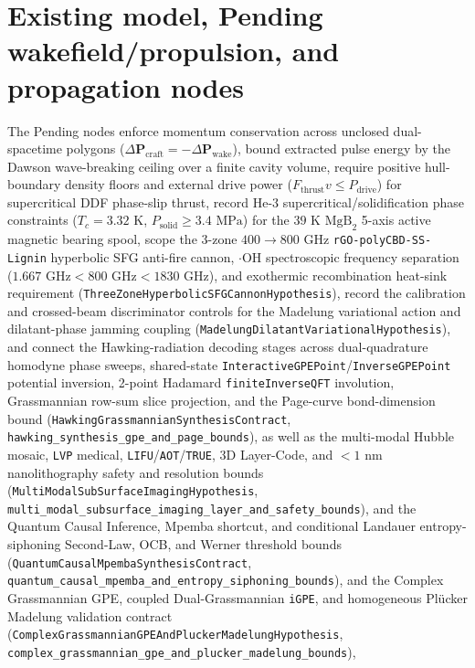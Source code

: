 \section{Existing model, Pending wakefield/propulsion, and propagation nodes}

The Pending nodes enforce momentum conservation across unclosed dual-spacetime
polygons ($\Delta\mathbf P_{\mathrm{craft}}=-\Delta\mathbf P_{\mathrm{wake}}$),
bound extracted pulse energy by the Dawson wave-breaking ceiling over a finite
cavity volume, require positive hull-boundary density floors and external drive
power ($F_{\mathrm{thrust}} v\le P_{\mathrm{drive}}$) for supercritical DDF
phase-slip thrust, record $\mathrm{He\text{-}3}$ supercritical/solidification
phase constraints ($T_c=3.32\text{ K}$, $P_{\mathrm{solid}}\ge 3.4\text{ MPa}$)
for the $39\text{ K}$ $\mathrm{MgB}_2$ 5-axis active magnetic bearing spool,
scope the 3-zone $400\to 800\text{ GHz}$ \texttt{rGO-polyCBD-SS-Lignin}
hyperbolic SFG anti-fire cannon, $\cdot\mathrm{OH}$ spectroscopic frequency
separation ($1.667\text{ GHz}<800\text{ GHz}<1830\text{ GHz}$), and exothermic
recombination heat-sink requirement (\texttt{ThreeZoneHyperbolicSFGCannonHypothesis}),
record the calibration and crossed-beam discriminator controls for the
Madelung variational action and dilatant-phase jamming coupling
(\texttt{MadelungDilatantVariationalHypothesis}), and connect the Hawking-radiation
decoding stages across dual-quadrature homodyne phase sweeps, shared-state
\texttt{InteractiveGPEPoint}/\texttt{InverseGPEPoint} potential inversion,
2-point Hadamard \texttt{finiteInverseQFT} involution, Grassmannian row-sum
slice projection, and the Page-curve bond-dimension bound
(\texttt{HawkingGrassmannianSynthesisContract}, \texttt{hawking\_synthesis\_gpe\_and\_page\_bounds}),
as well as the multi-modal Hubble mosaic, \texttt{LVP} medical, \texttt{LIFU}/\texttt{AOT}/\texttt{TRUE},
3D Layer-Code, and $<1\text{ nm}$ nanolithography safety and resolution bounds
(\texttt{MultiModalSubSurfaceImagingHypothesis}, \texttt{multi\_modal\_subsurface\_imaging\_layer\_and\_safety\_bounds}),
and the Quantum Causal Inference, Mpemba shortcut, and conditional Landauer
entropy-siphoning Second-Law, OCB, and Werner threshold bounds
(\texttt{QuantumCausalMpembaSynthesisContract}, \texttt{quantum\_causal\_mpemba\_and\_entropy\_siphoning\_bounds}),
and the Complex Grassmannian GPE, coupled Dual-Grassmannian \texttt{iGPE},
and homogeneous Plücker Madelung validation contract
(\texttt{ComplexGrassmannianGPEAndPluckerMadelungHypothesis},
\texttt{complex\_grassmannian\_gpe\_and\_plucker\_madelung\_bounds}),
